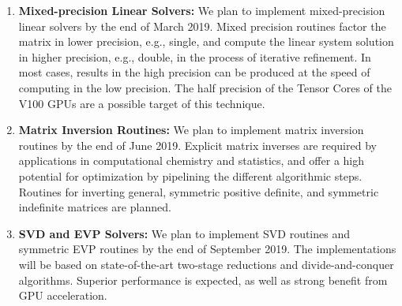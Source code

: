 \begin{enumerate}
\item
\textbf{Mixed-precision Linear Solvers:}
We plan to implement mixed-precision linear solvers by the end of March 2019.
Mixed precision routines factor the matrix in lower precision, e.g., single,
and compute the linear system solution in higher precision, e.g., double,
in the process of iterative refinement.
In most cases, results in the high precision can be produced at the speed
of computing in the low precision.
The half precision of the Tensor Cores of the V100 GPUs are a possible target
of this technique.
\item
\textbf{Matrix Inversion Routines:}
We plan to implement matrix inversion routines by the end of June 2019.
Explicit matrix inverses are required by applications in computational
chemistry and statistics, and offer a high potential for optimization
by pipelining the different algorithmic steps.
Routines for inverting general, symmetric positive definite, and symmetric
indefinite matrices are planned.
\item
\textbf{SVD and EVP Solvers:}
We plan to implement SVD routines and symmetric EVP routines
by the end of September 2019.
The implementations will be based on state-of-the-art two-stage reductions
and divide-and-conquer algorithms.
Superior performance is expected, as well as strong benefit
from GPU acceleration.
\end{enumerate}
